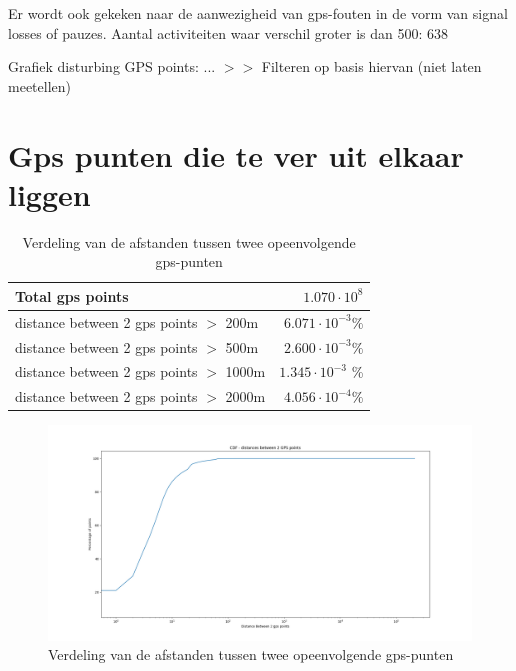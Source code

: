 Er wordt ook gekeken naar de aanwezigheid van \ac{gps}-fouten in de vorm van
signal losses of pauzes. Aantal activiteiten waar verschil groter is dan 500:
638

Grafiek disturbing GPS points: ... $>$$>$ Filteren op basis hiervan (niet laten
meetellen)

\section{Gps punten die te ver uit elkaar liggen}

\begin{table}[h]
    \centering
    \begin{tabular}{lr}
        \toprule
        \midrule
        Total gps points                        & $1.070 \cdot 10^8$        \\
        \hline
        distance between 2 gps points $>$ 200m  & $6.071 \cdot  10^{-3} \%$ \\
        distance between 2 gps points $>$ 500m  & $2.600 \cdot 10^{-3} \%$  \\
        distance between 2 gps points $>$ 1000m & $1.345 \cdot 10^{-3}$ \%  \\
        distance between 2 gps points $>$ 2000m & $4.056 \cdot 10^{-4} \%$  \\
        \midrule
        \bottomrule
    \end{tabular}
    \captionsetup{justification=centering}
    \caption{Verdeling van de afstanden tussen twee opeenvolgende gps-punten}\label{tab:distance_between_gps_points_table}
\end{table}
\begin{figure}
    \centering
    \includegraphics[width=\textwidth]{fig/Afwijkingen&Analyses/Graphs/Afstand tussen 2 gps-punten.png}
    \caption{Verdeling van de afstanden tussen twee opeenvolgende gps-punten}\label{fig:distance_between_gps_points_CDF}
\end{figure}

